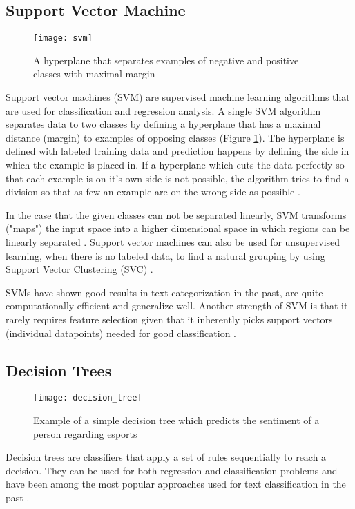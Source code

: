 \subsection{Support Vector Machine} \label{Support Vector Machine}
\begin{figure}[t]
\texttt{[image: svm]}
\centering
\caption{A hyperplane that separates examples of negative and positive classes with maximal margin}
\label{fig:svm}
\end{figure}
Support vector machines (SVM) are supervised machine learning algorithms that are used for classification and regression analysis.
A single SVM algorithm separates data to two classes by defining a hyperplane that has a maximal distance (margin) to examples of opposing classes (Figure \ref{fig:svm}).
The hyperplane is defined with labeled training data and prediction happens by defining the side in which the example is placed in. If a hyperplane which cuts the data perfectly so that each example is on it's own side is not possible, the algorithm tries to find a division so that as few an example are on the wrong side as possible \cite{hotho}.

In the case that the given classes can not be separated linearly, SVM transforms ("maps") the input space into a higher dimensional space in which regions can be linearly separated \cite{rigutini2004}.
Support vector machines can also be used for unsupervised learning, when there is no labeled data, to find a natural grouping by using Support Vector Clustering (SVC) \cite{ben-hur2001}.

SVMs have shown good results in text categorization in the past, are quite computationally efficient and generalize well.
Another strength of SVM is that it rarely requires feature selection given that it inherently picks support vectors (individual datapoints) needed for good classification \cite{hotho}.

\subsection{Decision Trees} \label{Decision Trees}

\begin{figure}[t]
\texttt{[image: decision\_tree]}
\centering
\caption{Example of a simple decision tree which predicts the sentiment of a person regarding esports}
\label{fig:decision_tree}
\end{figure}
Decision trees are classifiers that apply a set of rules sequentially to reach a decision.
They can be used for both regression and classification problems and have been among the most popular approaches used for text classification in the past \cite{hotho} \cite{rokach2005}.


